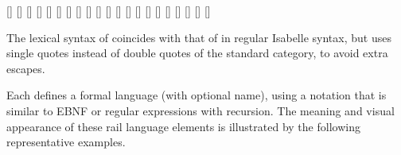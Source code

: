 \begin{isabellebody}
\begin{isamarkuptext}
  \begin{railoutput}
\rail@plus
\rail@bar
{}
[]
\rail@endbar
{}
[]
\rail@endplus
\rail@end
{}
\rail@bar
{}
\rail@bar
{}[]
[]
\rail@endbar
{}[]
\rail@endbar
{}[]
\rail@end
{}
\rail@plus
{}[]
[]
\rail@endplus
\rail@end
{}
\rail@plus
{}[]
\rail@bar
{}
[]
\rail@endbar
{}
\rail@endplus
\rail@bar
{}
\rail@bar
{}[]
[]
\rail@endbar
\rail@bar
{}
[]
\rail@endbar
\rail@endbar
\rail@end
{}
\rail@bar
{}[]
\rail@bar
{}
[]
\rail@endbar
{}[]
[]
\rail@bar
{}
[]
\rail@endbar
\rail@bar
{}[]
[]
\rail@endbar
{}
[]
\rail@endbar
\rail@end
\end{railoutput}


  The lexical syntax of  coincides with that of
  \hyperlink{syntax.ident}{\mbox{}} in regular Isabelle syntax, but  uses
  single quotes instead of double quotes of the standard \hyperlink{syntax.string}{\mbox{}} category, to avoid extra escapes.

  Each  defines a formal language (with optional name),
  using a notation that is similar to EBNF or regular expressions with
  recursion.  The meaning and visual appearance of these rail language
  elements is illustrated by the following representative examples.


\end{isamarkuptext}
\end{isabellebody}
